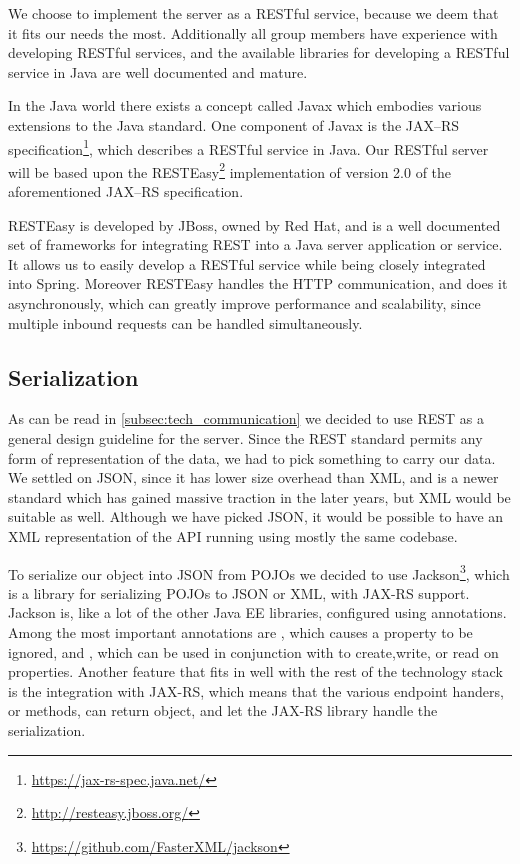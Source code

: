 We choose to implement the server as a RESTful service, because we deem that it fits our needs the most.
Additionally all group members have experience with developing RESTful services, and the available libraries for developing a RESTful service in Java are well documented and mature.

\bigskip
In the Java world there exists a concept called Javax which embodies various extensions to the Java standard.
One component of Javax is the JAX--RS specification\footnote{\url{https://jax-rs-spec.java.net/}}, which describes a RESTful service in Java.
Our RESTful server will be based upon the RESTEasy\footnote{\url{http://resteasy.jboss.org/}} implementation of version 2.0 of the aforementioned JAX--RS specification.

RESTEasy is developed by JBoss, owned by Red Hat, and is a well documented set of frameworks for integrating REST into a Java server application or service.
It allows us to easily develop a RESTful service while being closely integrated into Spring.
Moreover RESTEasy handles the HTTP communication, and does it asynchronously, which can greatly improve performance and scalability,
since multiple inbound requests can be handled simultaneously.

\subsection{Serialization}
As can be read in \cref{subsec:tech_communication} we decided to use REST as a general design guideline for the server.
Since the REST standard permits any form of representation of the data, we had to pick something to carry our data.
We settled on JSON, since it has lower size overhead than XML, and is a newer standard which has gained massive traction in the later years, but XML would be suitable as well.
Although we have picked JSON, it would be possible to have an XML representation of the API running using mostly the same codebase.

To serialize our object into JSON from \acp{POJO} we decided to use Jackson\footnote{\url{https://github.com/FasterXML/jackson}}, which is a library for serializing \acp{POJO} to JSON or XML, with JAX-RS support.
Jackson is, like a lot of the other \ac{Java EE} libraries, configured using annotations.
Among the most important annotations are , which causes a property to be ignored, and , which can be used in conjunction with  to create,write, or read on properties.
Another feature that fits in well with the rest of the technology stack is the integration with JAX-RS, which means that the various endpoint handers, or methods, can return object, and let the JAX-RS library handle the serialization.

